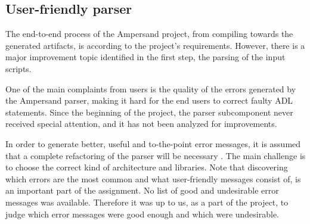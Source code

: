 
\subsection{User-friendly parser}
The end-to-end process of the Ampersand project, from compiling towards the generated artifacts, is according to the project's requirements.
However, there is a major improvement topic identified in the first step, the parsing of the input scripts.

One of the main complaints from users is the quality of the errors generated by the Ampersand parser, making it hard for the end users to correct faulty ADL statements.
Since the beginning of the project, the parser subcomponent never received special attention, and it has not been analyzed for improvements.

In order to generate better, useful and to-the-point error messages, it is assumed that a complete refactoring of the parser will be necessary .
The main challenge is to choose the correct kind of architecture and libraries.
Note that discovering which errors are the most common and what user-friendly messages consist of, is an important part of the assignment.
No list of good and undesirable error messages was available.
Therefore it was up to us, as a part of the project, to judge which error messages were good enough and which were undesirable.
